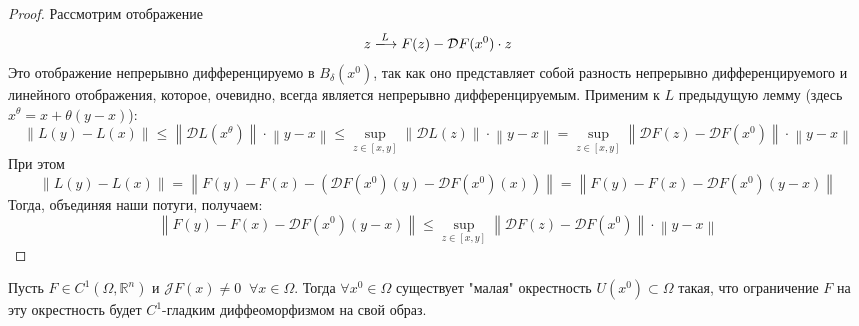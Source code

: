\documentclass[11pt]{article}
\begin{document}
\begin{proof}
    Рассмотрим отображение \[z \xlongrightarrow{L} F(z) - \mathcal{D} F(x^0) \cdot z\]
    Это отображение непрерывно дифференцируемо в $B_{\delta}(x^0)$, так как оно представляет собой разность непрерывно дифференцируемого и линейного отображения, которое, очевидно, всегда является непрерывно дифференцируемым.
    Применим к $L$ предыдущую лемму (здесь $x^{\theta} = x + \theta(y - x)$):
    \[\left\lVert L(y) - L(x) \right\rVert \leq \left\lVert \mathcal{D} L(x^{\theta}) \right\rVert \cdot \left\lVert y - x \right\rVert 
    \leq \sup_{z \in [x, y]} \left\lVert \mathcal{D} L(z) \right\rVert \cdot \left\lVert y - x \right\rVert = 
    \sup_{z \in [x, y]} \left\lVert \mathcal{D} F(z) - \mathcal{D} F(x^0) \right\rVert \cdot \left\lVert y - x \right\rVert\]
    При этом \[\left\lVert L(y) - L(x) \right\rVert = \left\lVert F(y) - F(x) - \left( \mathcal{D} F(x^0)(y) - \mathcal{D} F(x^0)(x) \right) \right\rVert = 
    \left\lVert F(y) - F(x) - \mathcal{D} F(x^0)(y - x) \right\rVert\]
    Тогда, объединяя наши потуги, получаем:
    \[\left\lVert F(y) - F(x) - \mathcal{D} F(x^0)(y - x) \right\rVert \leq \sup_{z \in [x, y]} \left\lVert \mathcal{D} F(z) - \mathcal{D} F(x^0) \right\rVert 
    \cdot \left\lVert y - x \right\rVert\]
\end{proof}

\begin{theorem}
    Пусть $F \in C^1(\Omega, \mathbb{R}^n)$ и $\mathcal{J} F(x) \neq 0 \; \; \forall x \in \Omega$.
    Тогда $\forall x^0 \in \Omega$ существует "малая" \; окрестность $U(x^0) \subset \Omega$ такая, что ограничение $F$ на эту окрестность будет $C^1 \text{-гладким}$ 
    диффеоморфизмом на свой образ.
\end{theorem}
\end{document}
